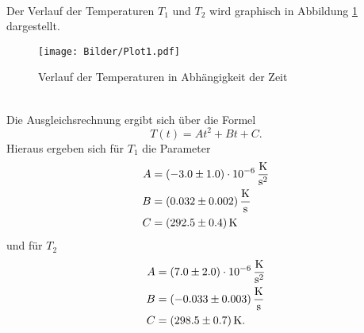 \\
Der Verlauf der Temperaturen $T_1$ und $T_2$ wird graphisch in Abbildung
\ref{fig:T1T2} dargestellt.
\begin{figure}[h]
  \centering
  \texttt{[image: Bilder/Plot1.pdf]}
  \caption{Verlauf der Temperaturen in Abhängigkeit der Zeit}
  \label{fig:T1T2}
\end{figure}
\\
Die Ausgleichsrechnung ergibt sich über die Formel
\begin{equation*}
  T(t) = At^2+Bt+C.
\end{equation*}
Hieraus ergeben sich für $T_1$ die Parameter
\begin{align*}
  A &= (-3.0 \pm 1.0) \cdot10^{-6}\,\si{\kelvin\per\square\second} \\
  B &= (0.032 \pm 0.002) \,\si{\kelvin\per\second} \\
  C &= (292.5 \pm 0.4) \,\si{\kelvin}
\end{align*}
und für $T_2$
\begin{align*}
  A &= (7.0 \pm 2.0) \cdot 10^{-6} \,\si{\kelvin\per\square\second}\\
  B &= (-0.033 \pm 0.003)  \,\si{\kelvin\per\second} \\
  C &= (298.5 \pm 0.7) \,\si{\kelvin}.
\end{align*}

